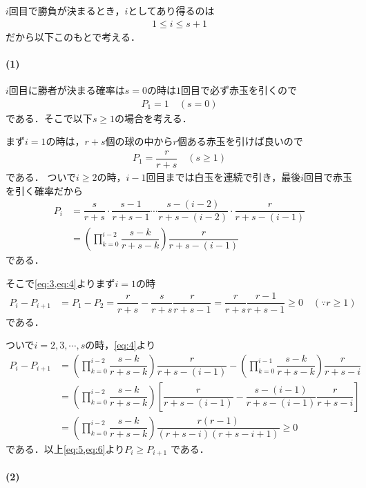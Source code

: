 \documentclass[../../main.tex]{subfiles}
\begin{document}
$i$回目で勝負が決まるとき，$i$としてあり得るのは
\begin{align}
  1 \le i \le s+1 \label{eq:1}
\end{align}
だから以下このもとで考える．

\paragraph{(1)}

$i$回目に勝者が決まる確率は$s=0$の時は$1$回目で必ず赤玉を引くので
\begin{align}
  P_1 = 1 \quad (s=0) \label{eq:2}
\end{align}
である．そこで以下$s \ge 1$の場合を考える．

まず$i=1$の時は，$r+s$個の球の中から$r$個ある赤玉を引けば良いので
\begin{align}
  P_1 = \dfrac{r}{r+s} \quad (s \ge 1) \label{eq:3}
\end{align}
である．
ついで$i \ge 2$の時，$i-1$回目までは白玉を連続で引き，最後$i$回目で赤玉を引く確率だから
\begin{align}
  P_i
  &= \dfrac{s}{r+s} \cdot \dfrac{s-1}{r+s-1} \cdots \dfrac{s-(i-2)}{r+s-(i-2)} \cdot \dfrac{r}{r+s-(i-1)} \\
  &=\left(\prod_{k=0}^{i-2}\dfrac{s-k}{r+s-k}\right)\dfrac{r}{r+s-(i-1)} \label{eq:4}
\end{align}
である．

そこで\cref{eq:3,eq:4}よりまず$i=1$の時
\begin{align}
  P_{i}-P_{i+1}
  & = P_1-P_2
  = \dfrac{r}{r+s} - \dfrac{s}{r+s}\dfrac{r}{r+s-1}
  = \dfrac{r}{r+s}\dfrac{r-1}{r+s-1} \ge 0 \quad (\because r \ge 1) \label{eq:5}
\end{align}
である．

ついで$i=2,3,\cdots,s$の時，\cref{eq:4}より
\begin{align}
  P_i - P_{i+1}
  &= \left(\prod_{k=0}^{i-2}\dfrac{s-k}{r+s-k}\right)\dfrac{r}{r+s-(i-1)}
  - \left(\prod_{k=0}^{i-1}\dfrac{s-k}{r+s-k}\right)\dfrac{r}{r+s-i} \\
  &= \left(\prod_{k=0}^{i-2}\dfrac{s-k}{r+s-k}\right)\left[\dfrac{r}{r+s-(i-1)}- \dfrac{s-(i-1)}{r+s-(i-1)}\dfrac{r}{r+s-i}\right] \\
  &= \left(\prod_{k=0}^{i-2}\dfrac{s-k}{r+s-k}\right)\dfrac{r(r-1)}{(r+s-i)(r+s-i+1)} \ge 0 \label{eq:6}
\end{align}
である．以上\cref{eq:5,eq:6}より$P_i \ge P_{i+1}$ である．

\paragraph{(2)}
\end{document}
